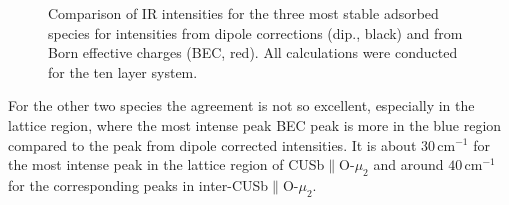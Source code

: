 \documentclass[11pt,DIV=13,BCOR=5mm,a4paper,headinclude]{scrbook}
\begin{document}
\begin{figure}[!h]
    \centering
              \quad
             \quad
             \caption{Comparison of IR intensities for the three most stable adsorbed species for intensities from dipole corrections (dip., black) and from Born effective charges (BEC, red).
             All calculations were conducted for the ten layer system.}
            \label{abb:bec-dip-comp}
\end{figure}
For the other two species the agreement is not so excellent, especially in the lattice region, where the most intense peak BEC peak is more in the blue region compared to the peak from dipole corrected intensities.
It is about $30\,$cm$^{-1}$ for the most intense peak in the lattice region of CUSb$\parallel$O-$\mu_2$ and around $40\,$cm$^{-1}$ for the corresponding peaks in inter-CUSb$\parallel$O-$\mu_2$.
\end{document}
